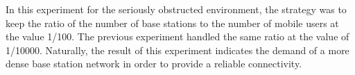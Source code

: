 \FloatBarrier
\vspace{1.5em}{\bf Analysis:} In this experiment for the seriously obstructed environment, the strategy was to keep the ratio of the number of base stations to the number of mobile users at the value 1/100. The previous experiment handled the same ratio at the value of 1/10000. Naturally, the result of this experiment indicates the demand of a more dense base station network in order to provide a reliable connectivity.

